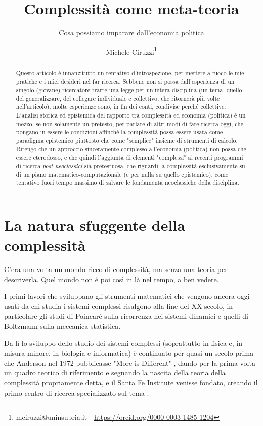 \documentclass[a4paper, headings=standardclasses]{scrartcl}
\title{Complessità come meta-teoria\let\thefootnote\relax\footnotetext{
		Questa versione è un lavoro preparatiorio per un articolo da presentare alla 2023 INEM Conference. \\
		È a sua volta basata su un precedente lavoro presentato alla 24esima ESHET Summer School. \\
		L'ultima versione disponibile di questo lavoro, insieme a una più concisa versione in inglese, è disponibile online \url{https://github.com/TnTo/complexity-economics/}.
}}
\subtitle{Cosa possiamo imparare dall'economia politica}
\author{Michele Ciruzzi\thanks{mciruzzi@uninsubria.it - \url{https://orcid.org/0000-0003-1485-1204}}}
\begin{document}
\maketitle

\begin{abstract}
    Questo articolo è innanzitutto un tentativo d'introspezione, per mettere a fuoco le mie pratiche e i miei desideri nel far ricerca.
    Sebbene non si possa dall'esperienza di un singolo (giovane) ricercatore trarre una legge per un'intera disciplina (un tema, quello del generalizzare, del collegare individuale e collettivo, che ritornerà più volte nell'articolo), molte esperienze sono, in fin dei conti, condivise perché collettive.
    L'analisi storica ed epistemica del rapporto tra complessità ed economia (politica) è un mezzo, se non solamente un pretesto, per parlare di altri modi di fare ricerca oggi, che pongano in essere le condizioni affinché la complessità possa essere usata come paradigma epistemico piuttosto che come "semplice" insieme di strumenti di calcolo.
    Ritengo che un approccio sinceramente complesso all'economia (politica) non possa che essere eterodosso, e che quindi l'aggiunta di elementi "complessi" ai recenti programmi di ricerca \textit{post-neoclassici} sia pretestuosa, che riguardi la complessità esclusivamente su di un piano matematico-computazionale (e per nulla su quello epistemico), come tentativo fuori tempo massimo di salvare le fondamenta neoclassiche della disciplina.
\end{abstract}

\section{La natura sfuggente della complessità}
C'era una volta un mondo ricco di complessità, ma senza una teoria per descriverla. Quel mondo non è poi così in là nel tempo, a ben vedere.

I primi lavori che sviluppano gli strumenti matematici che vengono ancora oggi usati da chi studia i sistemi complessi risalgono alla fine del XX secolo, in particolare gli studi di Poincaré sulla ricorrenza nei sistemi dinamici e quelli di Boltzmann sulla meccanica statistica.

Da lì lo sviluppo dello studio dei sistemi complessi (soprattutto in fisica e, in misura minore, in biologia e informatica) è continuato per quasi un secolo prima che Anderson nel 1972 pubblicasse "More is Different" \parencite{anderson1972}, dando per la prima volta un quadro teorico di riferimento e segnando la nascita della teoria della complessità propriamente detta, e il Santa Fe Institute venisse fondato, creando il primo centro di ricerca specializzato sul tema \parencite{fontana2010a}.
\end{document}
